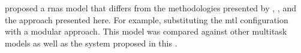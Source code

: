 
\textcite{mcleod2021modular} proposed a \glspl{rna} model
that differs from the methodologies presented by
\textcite{chen2021attend}, \textcite{micchi2021deep}, and
the approach presented here. For example, substituting
the \gls{mtl} configuration with a modular approach. This
model was compared against other multitask models as well as
the system proposed in this \thesisdiss{}.
